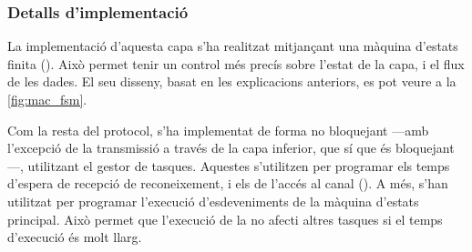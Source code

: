 \documentclass{tfgitic}[2024/07/01]
\begin{document}
\subsubsection{Detalls d'implementació}
La implementació d'aquesta capa s'ha realitzat mitjançant una màquina d'estats finita (). Això permet tenir un control més precís sobre l'estat de la capa, i el flux de les dades. El seu disseny, basat en les explicacions anteriors, es pot veure a la \autoref{fig:mac_fsm}.

Com la resta del protocol, s'ha implementat de forma no bloquejant ---amb l'excepció de la transmissió a través de la capa inferior, que sí que és bloquejant---, utilitzant el gestor de tasques. Aquestes s'utilitzen per programar els temps d'espera de recepció de reconeixement, i els de l'accés al canal (). A més, s'han utilitzat per programar l'execució d'esdeveniments de la màquina d'estats principal. Això permet que l'execució de la  no afecti altres tasques si el temps d'execució és molt llarg.
\end{document}

